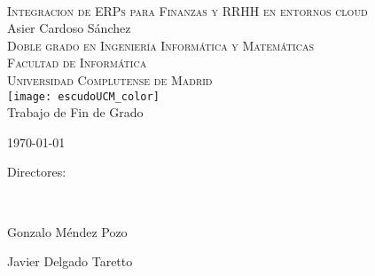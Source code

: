 \begin{titlepage}
	\begin{center}

		~\\[1.5cm]
		\textsc{\Large Integracion de ERPs para Finanzas y RRHH en entornos cloud}\\[1.5cm]

		{\Large Asier Cardoso Sánchez}\\[1.5cm]
        
        \textsc{\normalsize Doble grado en Ingeniería Informática y Matemáticas \\ Facultad de Informática \\ Universidad Complutense de Madrid}\\[1.5cm]
		
		
		\texttt{[image: escudoUCM\_color]}\\[1.5cm]
        
        {\normalsize Trabajo de Fin de Grado}
		
		\vfill
		{\large \today}\\[1cm]
	\end{center}
    
    \begin{flushright}
        Directores:

        \ 
        
        Gonzalo Méndez Pozo
        
		Javier Delgado Taretto
    \end{flushright}
\end{titlepage}
